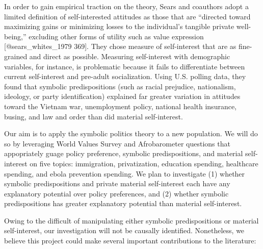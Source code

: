 \documentclass[]{article}
\begin{document}
In order to gain empirical traction on the theory, Sears and coauthors
adopt a limited definition of self-interested attitudes as those that
are ``directed toward maximizing gains or minimizing losses to the
individual's tangible private well-being,'' excluding other forms of
utility such as value expression {[}@sears\_whites\_1979 369{]}. They
chose measure of self-interest that are as fine-grained and direct as
possible. Measuring self-interest with demographic variables, for
instance, is problematic because it fails to differentiate between
current self-interest and pre-adult socialization. Using U.S. polling
data, they found that symbolic predispositions (such as racial
prejudice, nationalism, ideology, or party identification) explained far
greater variation in attitudes toward the Vietnam war, unemployment
policy, national health insurance, busing, and law and order than did
material self-interest.

Our aim is to apply the symbolic politics theory to a new population. We
will do so by leveraging World Values Survey and Afrobarometer questions
that appopriately guage policy preference, symbolic predispositions, and
material self-interest on five topics: immigration, privatization,
education spending, healthcare spending, and ebola prevention spending.
We plan to investigate (1) whether symbolic predispositions and private
material self-interest each have any explanatory potential over policy
preferences, and (2) whether symbolic predispositions has greater
explanatory potential than material self-interest.

Owing to the difficult of manipulating either symbolic predispositions
or material self-interest, our investigation will not be causally
identified. Nonetheless, we believe this project could make several
important contributions to the literature:
\end{document}
